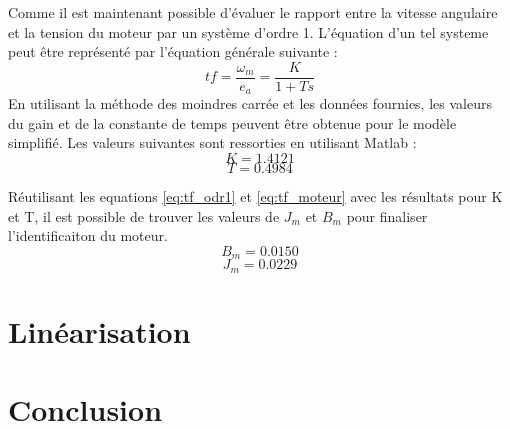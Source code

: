 \documentclass{udes_rapport} %
\begin{document}
Comme il est maintenant possible d'évaluer le rapport entre la vitesse angulaire et la tension du moteur par un système d'ordre 1. L'équation d'un tel systeme peut être représenté par l'équation générale suivante :
\begin{equation}
tf = \frac{\omega_m}{e_a} = \frac{K}{1+Ts}
\label{eq:tf_odr1}
\end{equation}
En utilisant la méthode des moindres carrée et les données fournies, les valeurs du gain et de la constante de temps peuvent être obtenue pour le modèle simplifié. Les valeurs suivantes sont ressorties en utilisant Matlab :
\[	K = 1.4121	\]
\[	T = 0.4984	\]

Réutilisant les equations \eqref{eq:tf_odr1} et \eqref{eq:tf_moteur} avec les résultats pour K et T, il est possible de trouver les valeurs de $J_m$ et $B_m$ pour finaliser l'identificaiton du moteur.
\[B_m = 0.0150	\]
\[J_m = 0.0229	\]
\section{Linéarisation}

\section{Conclusion}


\begin{comment}
\begin{center}
	\centering
	\texttt{[image: puissance]}
	\captionof{figure}{Spectre de puissance d'une onde de 1kHz}
	\label{puissance}
\end{center}


\section{Filtres FIR}
\noindent\begin{minipage}{\textwidth} 
\begin{minipage}{0.5\textwidth}
  \centering
  \texttt{[image: ampFIR]}
  \captionof{subfigure}{Amplitude}
  \label{FIR:ampFIR}
\end{minipage}%
\begin{minipage}{0.5\textwidth}
  \centering 
  \texttt{[image: phaseCute]} 
  \captionof{subfigure}{Phase} 
  \label{FIR:phaseFIR} 
\end{minipage} 
\captionof{figure}{Filtre IIR} 
\label{FIR} 
\end{minipage}
\end{comment}
\end{document}
